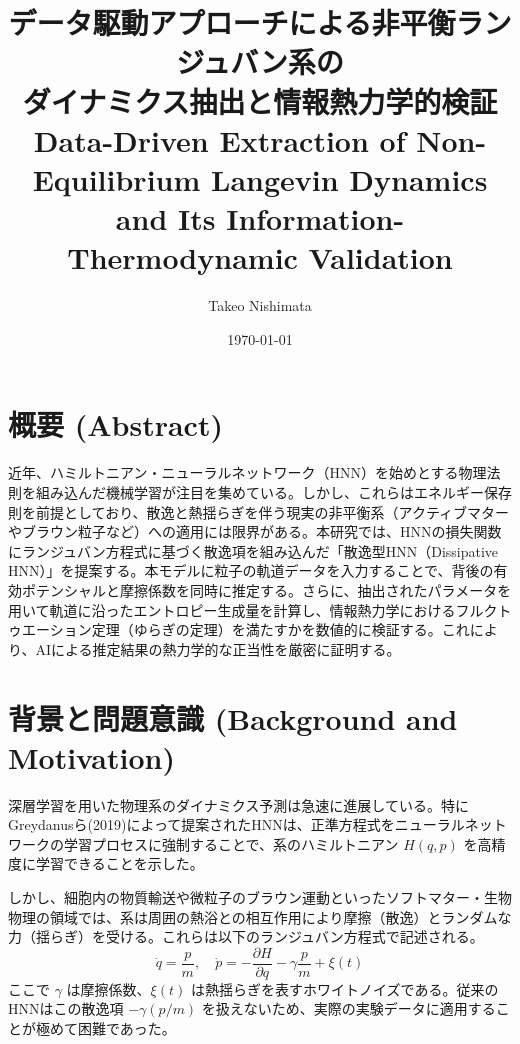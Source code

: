 \documentclass[a4paper,12pt]{jlreq}
\title{\textbf{データ駆動アプローチによる非平衡ランジュバン系の\\ダイナミクス抽出と情報熱力学的検証}\\
\large{Data-Driven Extraction of Non-Equilibrium Langevin Dynamics and Its Information-Thermodynamic Validation}}
\author{Takeo Nishimata}
\date{\today}
\begin{document}
\maketitle

\section{概要 (Abstract)}
近年、ハミルトニアン・ニューラルネットワーク（HNN）を始めとする物理法則を組み込んだ機械学習が注目を集めている。しかし、これらはエネルギー保存則を前提としており、散逸と熱揺らぎを伴う現実の非平衡系（アクティブマターやブラウン粒子など）への適用には限界がある。本研究では、HNNの損失関数にランジュバン方程式に基づく散逸項を組み込んだ「散逸型HNN（Dissipative HNN）」を提案する。本モデルに粒子の軌道データを入力することで、背後の有効ポテンシャルと摩擦係数を同時に推定する。さらに、抽出されたパラメータを用いて軌道に沿ったエントロピー生成量を計算し、情報熱力学におけるフルクトゥエーション定理（ゆらぎの定理）を満たすかを数値的に検証する。これにより、AIによる推定結果の熱力学的な正当性を厳密に証明する。

\section{背景と問題意識 (Background and Motivation)}
深層学習を用いた物理系のダイナミクス予測は急速に進展している。特にGreydanusら(2019)によって提案されたHNNは、正準方程式をニューラルネットワークの学習プロセスに強制することで、系のハミルトニアン $H(q,p)$ を高精度に学習できることを示した。

しかし、細胞内の物質輸送や微粒子のブラウン運動といったソフトマター・生物物理の領域では、系は周囲の熱浴との相互作用により摩擦（散逸）とランダムな力（揺らぎ）を受ける。これらは以下のランジュバン方程式で記述される。
\begin{equation}
    \dot{q} = \frac{p}{m}, \quad \dot{p} = -\frac{\partial H}{\partial q} - \gamma \frac{p}{m} + \xi(t)
\end{equation}
ここで $\gamma$ は摩擦係数、$\xi(t)$ は熱揺らぎを表すホワイトノイズである。従来のHNNはこの散逸項 $-\gamma (p/m)$ を扱えないため、実際の実験データに適用することが極めて困難であった。

\end{document}

